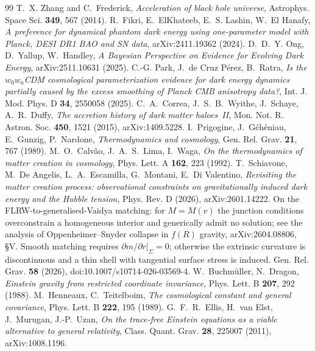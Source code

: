 \documentclass[11pt]{article}
\begin{document}
\begin{thebibliography}{99}
 T.~X. Zhang and C.~Frederick, \emph{Acceleration of black hole universe}, Astrophys. Space Sci. \textbf{349}, 567 (2014).
 R.~Fikri, E.~ElKhateeb, E.~S. Lashin, W.~El Hanafy, \emph{A preference for dynamical phantom dark energy using one-parameter model with Planck, DESI DR1 BAO and SN data}, arXiv:2411.19362 (2024).
 D.~D.~Y. Ong, D.~Yallup, W.~Handley, \emph{A Bayesian Perspective on Evidence for Evolving Dark Energy}, arXiv:2511.10631 (2025).
 C.-G. Park, J.~de Cruz P\'erez, B.~Ratra, \emph{Is the $w_0w_a$CDM cosmological parameterization evidence for dark energy dynamics partially caused by the excess smoothing of Planck CMB anisotropy data?}, Int. J. Mod. Phys. D \textbf{34}, 2550058 (2025).
 C.~A.~Correa, J.~S.~B.~Wyithe, J.~Schaye, A.~R.~Duffy, \emph{The accretion history of dark matter haloes~II}, Mon. Not. R. Astron. Soc. \textbf{450}, 1521 (2015), arXiv:1409.5228.
 I.~Prigogine, J.~G\'eh\'eniau, E.~Gunzig, P.~Nardone, \emph{Thermodynamics and cosmology}, Gen. Rel. Grav. \textbf{21}, 767 (1989).
 M.~O.~Calv\~ao, J.~A.~S.~Lima, I.~Waga, \emph{On the thermodynamics of matter creation in cosmology}, Phys. Lett. A \textbf{162}, 223 (1992).
 T.~Schiavone, M.~De Angelis, L.~A.~Escamilla, G.~Montani, E.~Di Valentino, \emph{Revisiting the matter creation process: observational constraints on gravitationally induced dark energy and the Hubble tension}, Phys. Rev. D (2026), arXiv:2601.14222.
 On the FLRW-to-generalised-Vaidya matching: for $M = M(v)$ the junction conditions overconstrain a homogeneous interior and generically admit no solution; see the analysis of Oppenheimer--Snyder collapse in $f(R)$ gravity, arXiv:2604.08806, \S V.
 Smooth matching requires $\partial m/\partial r|_\Sigma = 0$; otherwise the extrinsic curvature is discontinuous and a thin shell with tangential surface stress is induced. Gen. Rel. Grav. \textbf{58} (2026), doi:10.1007/s10714-026-03569-4.
 W.~Buchm\"uller, N.~Dragon, \emph{Einstein gravity from restricted coordinate invariance}, Phys. Lett. B \textbf{207}, 292 (1988).
 M.~Henneaux, C.~Teitelboim, \emph{The cosmological constant and general covariance}, Phys. Lett. B \textbf{222}, 195 (1989).
 G.~F.~R.~Ellis, H.~van Elst, J.~Murugan, J.-P.~Uzan, \emph{On the trace-free Einstein equations as a viable alternative to general relativity}, Class. Quant. Grav. \textbf{28}, 225007 (2011), arXiv:1008.1196.

\end{thebibliography}
\end{document}
